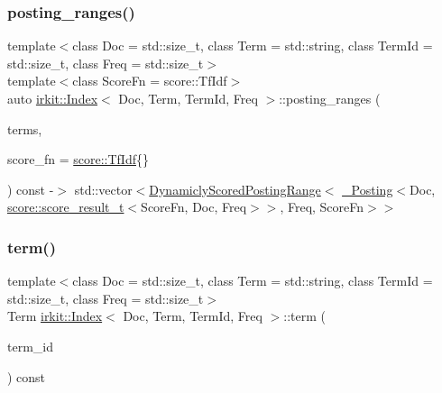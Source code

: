 \subsubsection{\texorpdfstring{posting\+\_\+ranges()}{posting\_ranges()}}
{\footnotesize\ttfamily template$<$class Doc  = std\+::size\+\_\+t, class Term  = std\+::string, class Term\+Id  = std\+::size\+\_\+t, class Freq  = std\+::size\+\_\+t$>$ \\
template$<$class Score\+Fn  = score\+::\+Tf\+Idf$>$ \\
auto \hyperlink{classirkit_1_1Index}{irkit\+::\+Index}$<$ Doc, Term, Term\+Id, Freq $>$\+::posting\+\_\+ranges (\begin{DoxyParamCaption}\item[{const std\+::vector$<$ std\+::string $>$ \&}]{terms,  }\item[{Score\+Fn}]{score\+\_\+fn = {\ttfamily \hyperlink{structirkit_1_1score_1_1TfIdf}{score\+::\+Tf\+Idf}\{\}} }\end{DoxyParamCaption}) const -\/$>$ std\+::vector$<$\hyperlink{classirkit_1_1DynamiclyScoredPostingRange}{Dynamicly\+Scored\+Posting\+Range}$<$
            \hyperlink{structirkit_1_1__Posting}{\+\_\+\+Posting}$<$Doc, \hyperlink{namespaceirkit_1_1score_ab6226695d6d5c54c84fcf2cb8e90c8b3}{score\+::score\+\_\+result\+\_\+t}$<$Score\+Fn, Doc, Freq$>$$>$,
            Freq,
            Score\+Fn$>$$>$
    \hspace{0.3cm}{\ttfamily [inline]}}

\mbox{\label{classirkit_1_1Index_a62050b0a8c8556262b82a45be1ae0262}} 
\subsubsection{\texorpdfstring{term()}{term()}}
{\footnotesize\ttfamily template$<$class Doc  = std\+::size\+\_\+t, class Term  = std\+::string, class Term\+Id  = std\+::size\+\_\+t, class Freq  = std\+::size\+\_\+t$>$ \\
Term \hyperlink{classirkit_1_1Index}{irkit\+::\+Index}$<$ Doc, Term, Term\+Id, Freq $>$\+::term (\begin{DoxyParamCaption}\item[{Term\+Id}]{term\+\_\+id }\end{DoxyParamCaption}) const\hspace{0.3cm}{\ttfamily [inline]}}


